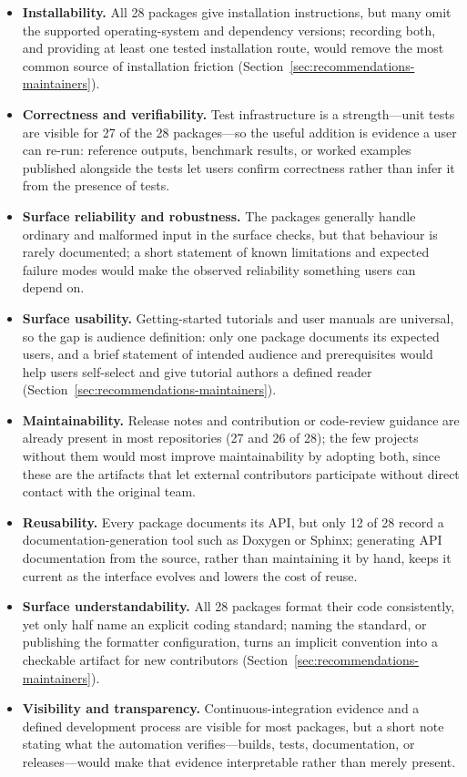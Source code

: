 \begin{itemize}
\item \textbf{Installability.} All 28 packages give installation instructions, but many omit the supported operating-system and dependency versions; recording both, and providing at least one tested installation route, would remove the most common source of installation friction (Section~\ref{sec:recommendations-maintainers}).
\item \textbf{Correctness and verifiability.} Test infrastructure is a strength---unit tests are visible for 27 of the 28 packages---so the useful addition is evidence a user can re-run: reference outputs, benchmark results, or worked examples published alongside the tests let users confirm correctness rather than infer it from the presence of tests.
\item \textbf{Surface reliability and robustness.} The packages generally handle ordinary and malformed input in the surface checks, but that behaviour is rarely documented; a short statement of known limitations and expected failure modes would make the observed reliability something users can depend on.
\item \textbf{Surface usability.} Getting-started tutorials and user manuals are universal, so the gap is audience definition: only one package documents its expected users, and a brief statement of intended audience and prerequisites would help users self-select and give tutorial authors a defined reader (Section~\ref{sec:recommendations-maintainers}).
\item \textbf{Maintainability.} Release notes and contribution or code-review guidance are already present in most repositories (27 and 26 of 28); the few projects without them would most improve maintainability by adopting both, since these are the artifacts that let external contributors participate without direct contact with the original team.
\item \textbf{Reusability.} Every package documents its API, but only 12 of 28 record a documentation-generation tool such as Doxygen or Sphinx; generating API documentation from the source, rather than maintaining it by hand, keeps it current as the interface evolves and lowers the cost of reuse.
\item \textbf{Surface understandability.} All 28 packages format their code consistently, yet only half name an explicit coding standard; naming the standard, or publishing the formatter configuration, turns an implicit convention into a checkable artifact for new contributors (Section~\ref{sec:recommendations-maintainers}).
\item \textbf{Visibility and transparency.} Continuous-integration evidence and a defined development process are visible for most packages, but a short note stating what the automation verifies---builds, tests, documentation, or releases---would make that evidence interpretable rather than merely present.
\end{itemize}

